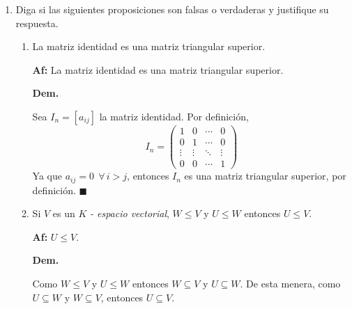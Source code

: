 \documentclass[fleqn]{article}
\begin{document}
    \begin{enumerate}
        \bfseries
        \item Diga si las siguientes proposiciones son falsas o verdaderas y justifique su respuesta.
    
        \begin{enumerate}
            \item La matriz identidad es una matriz triangular superior. \par
            
            \normalfont
            \textbf{Af:} La matriz identidad es una matriz triangular superior. \par

            \hspace{2.7mm} \textbf{Dem.} \par

            Sea $ I_n = [a_{ij}] $ la matriz identidad. Por definición, 
            \begin{equation*}
                I_n = 
                \begin{pmatrix}
                    1      & 0      & \cdots & 0\\ 
                    0      & 1      & \cdots & 0\\
                    \vdots & \vdots & \ddots & \vdots\\
                    0      & 0      & \cdots & 1
                \end{pmatrix}
            \end{equation*}
            Ya que $ a_{ij} = 0 \;\, \forall \, i > j $, entonces $ I_n $ es una matriz triangular superior, por definición. $ \blacksquare $ \par

            \bfseries
            \item Si $ V $ es un $ K $ \textsl{- espacio vectorial}, $ W \leq V $ y $ U \leq W $ entonces $ U \leq V $. \par
            
            \normalfont
            \textbf{Af:} $ U \leq V $. \par

            \hspace{2.7mm}\textbf{Dem.} \par

            Como $ W \leq V $ y $ U \leq W $ entonces $ W \subseteq V $ y $ U \subseteq W $. De esta menera, como $ U \subseteq W $ y $ W \subseteq V $, entonces $ U \subseteq V $. \par


\end{enumerate}
\end{enumerate}
\end{document}
